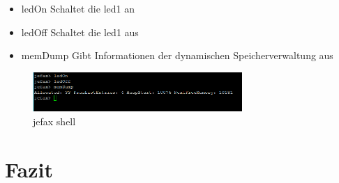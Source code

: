 \documentclass[fontsize=12pt, toc=bibliography, notitlepage]{scrreprt}
\begin{document}
\begin{itemize}
	\item ledOn Schaltet die led1 an
	\item ledOff Schaltet die led1 aus
	\item memDump Gibt Informationen der dynamischen Speicherverwaltung aus
\end{itemize}

\begin{figure}[H]
	\centering
	\includegraphics[width=300px]{images/shell.png}
	\caption{jefax shell}
	\label{fig:shell}
\end{figure}

\chapter{Fazit}
\label{chap:fazit}

\begin{thebibliography}{999}
	
\end{thebibliography}

\cleardoublepage
{}
\listoffigures
\end{document}
